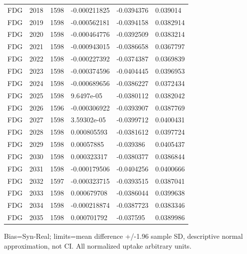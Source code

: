 \begin{longtable}{llllll}
FDG & 2018 & 1598 & -0.000211825 & -0.0394376 & 0.039014 \\
FDG & 2019 & 1598 & -0.000562181 & -0.0394158 & 0.0382914 \\
FDG & 2020 & 1598 & -0.000464776 & -0.0392509 & 0.0383214 \\
FDG & 2021 & 1598 & -0.000943015 & -0.0386658 & 0.0367797 \\
FDG & 2022 & 1598 & -0.000227392 & -0.0374387 & 0.0369839 \\
FDG & 2023 & 1598 & -0.000374596 & -0.0404445 & 0.0396953 \\
FDG & 2024 & 1598 & -0.000689656 & -0.0386227 & 0.0372434 \\
FDG & 2025 & 1598 & 9.6497e-05 & -0.0380112 & 0.0382042 \\
FDG & 2026 & 1596 & -0.000306922 & -0.0393907 & 0.0387769 \\
FDG & 2027 & 1598 & 3.59302e-05 & -0.0399712 & 0.0400431 \\
FDG & 2028 & 1598 & 0.000805593 & -0.0381612 & 0.0397724 \\
FDG & 2029 & 1598 & 0.00057885 & -0.039386 & 0.0405437 \\
FDG & 2030 & 1598 & 0.000323317 & -0.0380377 & 0.0386844 \\
FDG & 2031 & 1598 & -0.000179506 & -0.0404256 & 0.0400666 \\
FDG & 2032 & 1597 & -0.000323715 & -0.0393515 & 0.0387041 \\
FDG & 2033 & 1598 & 0.000679708 & -0.0386044 & 0.0399638 \\
FDG & 2034 & 1598 & -0.000218874 & -0.0387723 & 0.0383346 \\
FDG & 2035 & 1598 & 0.000701792 & -0.037595 & 0.0389986 \\
\end{longtable}
\noindent\parbox{\linewidth}{\footnotesize Bias=Syn-Real; limits=mean difference +/-1.96 sample SD, descriptive normal approximation, not CI. All normalized uptake arbitrary units.}
\endgroup
